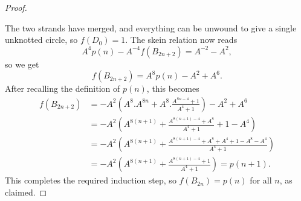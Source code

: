 \documentclass[reqno]{amsart}
\theoremstyle{definition}
\begin{document}
\begin{proof}
\begin{center}
 \end{center}
 The two strands have merged, and everything can be unwound to give a
 single unknotted circle, so $f(D_0)=1$.  The skein relation now reads
 \[ A^4 p(n) - A^{-4} f(B_{2n+2}) = A^{-2}-A^2, \]
 so we get 
 \[ f(B_{2n+2}) = A^8 p(n) - A^2 + A^6. \]
 After recalling the definition of $p(n)$, this becomes
 \begin{align*}
  f(B_{2n+2}) &= 
   -A^2\left(A^8.A^{8n} + A^8.\frac{A^{8n-4}+1}{A^4+1}\right) - A^2 + A^6 \\
  &= -A^2\left(A^{8(n+1)} + \frac{A^{8(n+1)-4}+A^8}{A^4+1} + 1 - A^4\right) \\
  &= -A^2\left(A^{8(n+1)} + \frac{A^{8(n+1)-4}+A^8+A^4+1-A^8-A^4}{A^4+1}\right) \\
  &= -A^2\left(A^{8(n+1)} + \frac{A^{8(n+1)-4}+1}{A^4+1}\right) = p(n+1).
 \end{align*}
 This completes the required induction step, so $f(B_{2n})=p(n)$ for
 all $n$, as claimed.
\end{proof}
\end{document}
